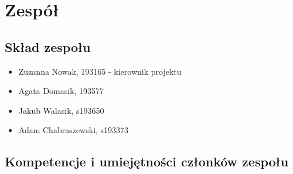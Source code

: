 \documentclass[12pt,a4paper,colorlinks=true,linkcolor=NavyBlue,citecolor=red,urlcolor=NavyBlue]{book}
\begin{document}
\chapter{Zespół}
\section{Skład zespołu}
\begin{itemize}
        \item Zuzanna Nowak, 193165 - kierownik projektu
        \item Agata Domasik, 193577
        \item Jakub Walasik, s193650
        \item Adam Chabraszewski, s193373
\end{itemize}

\section{Kompetencje i umiejętności członków zespołu}
\end{document}
